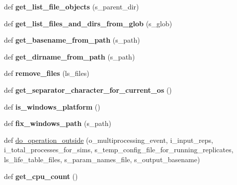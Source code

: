 \begin{DoxyCompactItemize}
\item 
def {\bfseries get\+\_\+list\+\_\+file\+\_\+objects} (s\+\_\+parent\+\_\+dir)\hypertarget{namespacenegui_1_1pgutilities_ad045331ad9e74cc1d8fdc2a8c2b050af}{}\label{namespacenegui_1_1pgutilities_ad045331ad9e74cc1d8fdc2a8c2b050af}

\item 
def {\bfseries get\+\_\+list\+\_\+files\+\_\+and\+\_\+dirs\+\_\+from\+\_\+glob} (s\+\_\+glob)\hypertarget{namespacenegui_1_1pgutilities_aa5d355d2c26bf4992ce682449dfb93fc}{}\label{namespacenegui_1_1pgutilities_aa5d355d2c26bf4992ce682449dfb93fc}

\item 
def {\bfseries get\+\_\+basename\+\_\+from\+\_\+path} (s\+\_\+path)\hypertarget{namespacenegui_1_1pgutilities_abbecfce3431917f0ed764bc056b04fdc}{}\label{namespacenegui_1_1pgutilities_abbecfce3431917f0ed764bc056b04fdc}

\item 
def {\bfseries get\+\_\+dirname\+\_\+from\+\_\+path} (s\+\_\+path)\hypertarget{namespacenegui_1_1pgutilities_ae147f21f478f594d3e696d9198fa999b}{}\label{namespacenegui_1_1pgutilities_ae147f21f478f594d3e696d9198fa999b}

\item 
def {\bfseries remove\+\_\+files} (ls\+\_\+files)\hypertarget{namespacenegui_1_1pgutilities_ab276fa71e3e15636a51644dcb4f395ba}{}\label{namespacenegui_1_1pgutilities_ab276fa71e3e15636a51644dcb4f395ba}

\item 
def {\bfseries get\+\_\+separator\+\_\+character\+\_\+for\+\_\+current\+\_\+os} ()\hypertarget{namespacenegui_1_1pgutilities_a58912c5a49fed034b7899bae2763ea42}{}\label{namespacenegui_1_1pgutilities_a58912c5a49fed034b7899bae2763ea42}

\item 
def {\bfseries is\+\_\+windows\+\_\+platform} ()\hypertarget{namespacenegui_1_1pgutilities_afc489aeb6d08669a944cea475609c3ab}{}\label{namespacenegui_1_1pgutilities_afc489aeb6d08669a944cea475609c3ab}

\item 
def {\bfseries fix\+\_\+windows\+\_\+path} (s\+\_\+path)\hypertarget{namespacenegui_1_1pgutilities_a84406a87eec039d98e307a1e716b033d}{}\label{namespacenegui_1_1pgutilities_a84406a87eec039d98e307a1e716b033d}

\item 
def \hyperlink{namespacenegui_1_1pgutilities_afb5f5345fa17095a87638daf969f4ebb}{do\+\_\+operation\+\_\+outside} (o\+\_\+multiprocessing\+\_\+event, i\+\_\+input\+\_\+reps, i\+\_\+total\+\_\+processes\+\_\+for\+\_\+sims, s\+\_\+temp\+\_\+config\+\_\+file\+\_\+for\+\_\+running\+\_\+replicates, ls\+\_\+life\+\_\+table\+\_\+files, s\+\_\+param\+\_\+names\+\_\+file, s\+\_\+output\+\_\+basename)
\item 
def {\bfseries get\+\_\+cpu\+\_\+count} ()\hypertarget{namespacenegui_1_1pgutilities_a651d0e76f36897c5ca20e6d40d1a46a7}{}\label{namespacenegui_1_1pgutilities_a651d0e76f36897c5ca20e6d40d1a46a7}


\end{DoxyCompactItemize}

